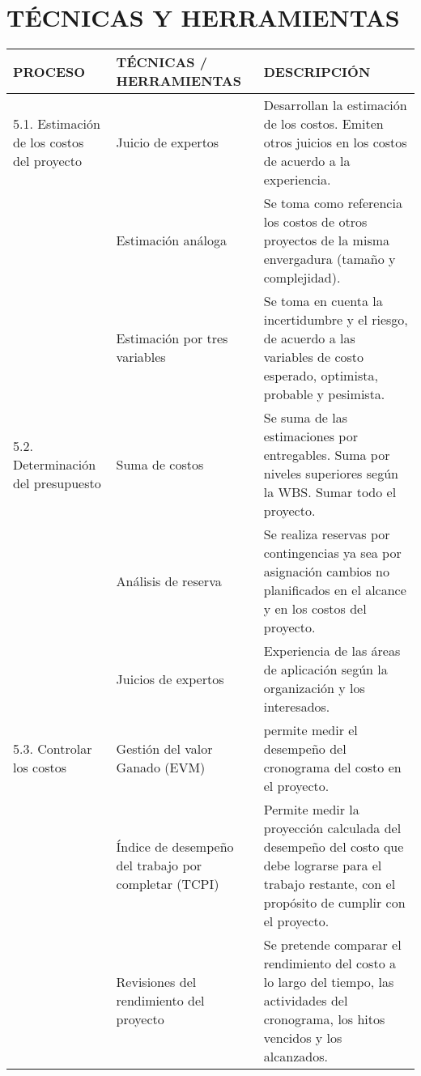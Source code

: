 \chapter{T\'ECNICAS Y HERRAMIENTAS}
%
\begin{table}[H]
	\centering
	\begin{tabular}{| m{4cm} | p{5cm} | p{6cm} |}
	\hline
	\textbf{PROCESO} & \textbf{T\'ECNICAS / HERRAMIENTAS} & \textbf{DESCRIPCI\'ON} \\ \hline
	5.1. Estimaci\'on de los costos del proyecto & Juicio de expertos & Desarrollan la estimaci\'on de los costos.
		Emiten otros juicios en los costos de acuerdo a la experiencia. \\
	\cline{2-3}
	& Estimaci\'on an\'aloga & Se toma como referencia los costos de otros proyectos de la misma envergadura 
		(tama\~no y complejidad).\\
	\cline{2-3}
	& Estimaci\'on por tres variables & Se toma en cuenta la incertidumbre y el riesgo, de  acuerdo a las variables
		de costo esperado, optimista, probable y pesimista.\\
	\hline
	5.2. Determinaci\'on del presupuesto & Suma de costos & Se suma de las estimaciones por entregables. Suma por 
		niveles superiores seg\'un la WBS. Sumar todo el proyecto.\\ 
	  \cline{2-3}
	 & An\'alisis de reserva & Se realiza reservas por contingencias ya sea por asignaci\'on cambios no planificados 
	 	en el alcance y en los costos del proyecto.\\
	\cline{2-3}
	& Juicios de expertos & Experiencia de las \'areas de aplicaci\'on seg\'un la organizaci\'on y los 
		interesados.\\
	\hline
	5.3. Controlar los costos & Gesti\'on  del valor Ganado (EVM) & permite medir el desempe\~no del  cronograma del
		costo en el proyecto.\\
	\cline{2-3}
	& \'Indice de desempe\~no del trabajo por completar (TCPI) & Permite medir la proyecci\'on calculada del 
		desempe\~no del costo que debe lograrse para el trabajo restante, con el prop\'osito de cumplir con el 	
		proyecto.\\
	\cline{2-3}
	& Revisiones del rendimiento del proyecto & Se pretende comparar el rendimiento del costo a lo largo del tiempo, 
		las actividades del cronograma, los hitos vencidos y los alcanzados.\\
	\hline
	\end{tabular}
	
\end{table}